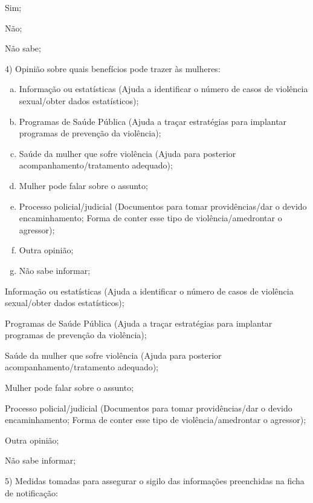 \documentclass{article}
\begin{document}
Sim;

Não;

Não sabe;

4) Opinião sobre quais benefícios pode trazer às mulheres:

\begin{enumerate}[a)]
\item
Informação ou estatísticas (Ajuda a identificar o número de casos de violência
sexual/obter dados estatísticos);

\item
Programas de Saúde Pública (Ajuda a traçar estratégias para implantar programas
de prevenção da violência);

\item
Saúde da mulher que sofre violência (Ajuda para posterior
acompanhamento/tratamento adequado);

\item
Mulher pode falar sobre o assunto;

\item
Processo policial/judicial (Documentos para tomar providências/dar o devido
encaminhamento; Forma de conter esse tipo de violência/amedrontar o agressor);

\item
Outra opinião;

\item
Não sabe informar;

\end{enumerate}

Informação ou estatísticas (Ajuda a identificar o número de casos de violência
sexual/obter dados estatísticos);

Programas de Saúde Pública (Ajuda a traçar estratégias para implantar programas
de prevenção da violência);

Saúde da mulher que sofre violência (Ajuda para posterior
acompanhamento/tratamento adequado);

Mulher pode falar sobre o assunto;

Processo policial/judicial (Documentos para tomar providências/dar o devido
encaminhamento; Forma de conter esse tipo de violência/amedrontar o agressor);

Outra opinião;

Não sabe informar;

5) Medidas tomadas para assegurar o sigilo das informações preenchidas na ficha
de notificação:
\end{document}
